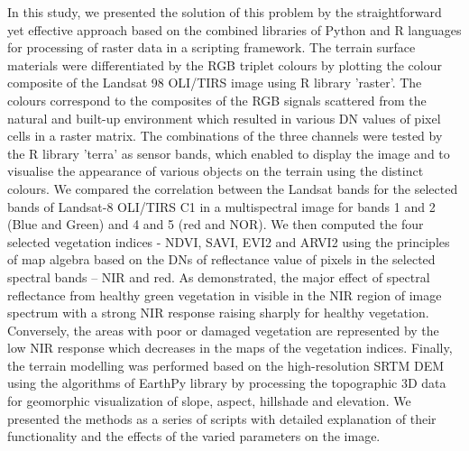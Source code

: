\documentclass[algorithms,article,submit,pdftex,moreauthors]{Definitions/mdpi}
\begin{document}
In this study, we presented the solution of this problem by the straightforward yet effective approach based on the combined libraries of Python and R languages for processing of raster data in a scripting framework. The terrain surface materials were differentiated by the RGB triplet colours by plotting the colour composite of the Landsat 98 OLI/TIRS image using R library 'raster'. The colours correspond to the composites of the RGB signals scattered from the natural and built-up environment which resulted in various DN values of pixel cells in a raster matrix. The combinations of the three channels were tested by the R library 'terra' as sensor bands, which enabled to display the image and to visualise the appearance of various objects on the terrain using the distinct colours. We compared the correlation between the Landsat bands for the selected bands of Landsat-8 OLI/TIRS C1 in a multispectral image for bands 1 and 2 (Blue and Green) and 4 and 5 (red and NOR). We then computed the four selected vegetation indices - NDVI, SAVI, EVI2 and ARVI2 using the principles of map algebra based on the DNs of reflectance value of pixels in the selected spectral bands -- NIR and red. As demonstrated, the major effect of spectral reflectance from healthy green vegetation in visible in the NIR region of image spectrum with a strong NIR response raising sharply for healthy vegetation. Conversely, the areas with poor or damaged vegetation are represented by the low NIR response which decreases in the maps of the vegetation indices. Finally, the terrain modelling was performed based on the high-resolution SRTM DEM using the algorithms of EarthPy library by processing the topographic 3D data for geomorphic visualization of slope, aspect, hillshade and elevation. We presented the methods as a series of scripts with detailed explanation of their functionality and the effects of the varied parameters on the image. 
\end{document}
